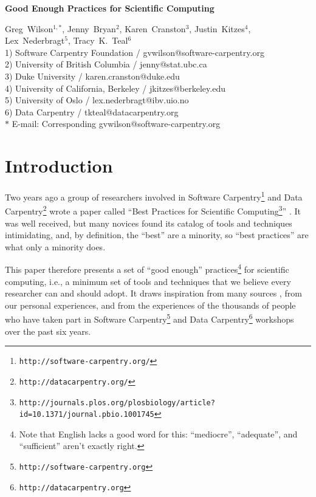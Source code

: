 \documentclass[10pt]{article}
\date{}
\newcommand{\withurl}[2]{{#1}\footnote{\texttt{#2}}}
\begin{document}
\begin{flushleft}
{\Large
\textbf{Good Enough Practices for Scientific Computing}
}

{Greg~Wilson}$^{1,\ast}$,
{Jenny~Bryan}$^{2}$,
{Karen~Cranston}$^{3}$,
{Justin~Kitzes}$^{4}$,
{Lex~Nederbragt}$^{5}$,
{Tracy~K.~Teal}$^{6}$
\\
1) Software Carpentry Foundation / gvwilson@software-carpentry.org
\\
2) University of British Columbia / jenny@stat.ubc.ca
\\
3) Duke University / karen.cranston@duke.edu
\\
4) University of California, Berkeley / jkitzes@berkeley.edu
\\
5) University of Oslo / lex.nederbragt@ibv.uio.no
\\
6) Data Carpentry / tkteal@datacarpentry.org
\\
$\ast$ E-mail: Corresponding gvwilson@software-carpentry.org
\end{flushleft}

\section{Introduction}\label{sec:introduction}

Two years ago a group of researchers involved in \withurl{Software
  Carpentry}{http://software-carpentry.org/} and \withurl{Data
  Carpentry}{http://datacarpentry.org/} wrote a paper called
``\withurl{Best Practices for Scientific
  Computing}{http://journals.plos.org/plosbiology/article?id=10.1371/journal.pbio.1001745}''
\cite{wilson2014}. It was well received,
but many novices found its catalog of tools and
techniques intimidating, and, by definition, the ``best'' are a
minority, so ``best practices'' are what only a minority does.

This paper therefore presents a set of ``good enough''
practices\footnote{Note that English lacks a good word for this:
  ``mediocre'', ``adequate'', and ``sufficient'' aren't exactly
  right.} for scientific computing, i.e., a minimum set of tools and techniques that we believe every
researcher can and should adopt. It draws inspiration from many
sources \cite{gentzkow2014,noble2009,brown2015,wickham2014,kitzes2016,sandve2013,hart2015},
from our personal experiences,
and from the experiences of the thousands of people who have taken part
in \withurl{Software Carpentry}{http://software-carpentry.org}
and \withurl{Data Carpentry}{http://datacarpentry.org} workshops over the past six years.
\end{document}
